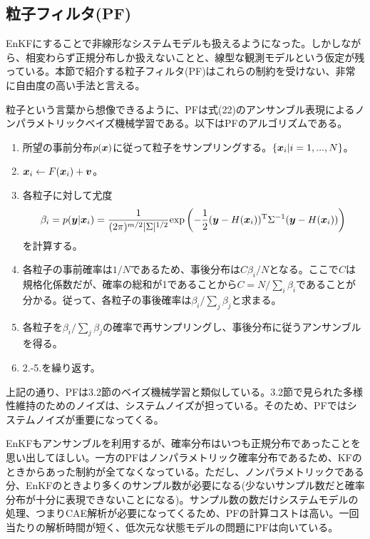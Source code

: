 \documentclass[dvipdfmx, 9pt, a4paper]{jsarticle}
\newcommand{\bm}[1]{{\mbox{\boldmath $#1$}}}
\begin{document}
\subsection{粒子フィルタ(PF)}
EnKFにすることで非線形なシステムモデルも扱えるようになった。しかしながら、相変わらず正規分布しか扱えないことと、線型な観測モデルという仮定が残っている。本節で紹介する粒子フィルタ(PF)はこれらの制約を受けない、非常に自由度の高い手法と言える。\par
粒子という言葉から想像できるように、PFは式(22)のアンサンブル表現によるノンパラメトリックベイズ機械学習である。以下はPFのアルゴリズムである。
\begin{tcolorbox}[title=粒子フィルタ]
\begin{enumerate}
\item 所望の事前分布$p(\bm x)$に従って粒子をサンプリングする。$\{ \bm x_i|i=1,...,N \}$。
\item $\bm x_i \leftarrow F(\bm x_i)+\bm v$。
\item 各粒子に対して尤度
\begin{equation}
\beta_i=p(\bm y|\bm x_i)=\frac{1}{(2\pi)^{m/2}|\Sigma|^{1/2}}{\rm exp}\left(
-\frac{1}{2}(\bm y-H(\bm x_i))^{\rm T}\Sigma^{-1}(\bm y-H(\bm x_i))
\right) \notag
\end{equation}
を計算する。
\item 各粒子の事前確率は$1/N$であるため、事後分布は$C\beta_i/N$となる。ここで$C$は規格化係数だが、確率の総和が1であることから$C=N/\sum_i \beta_i$であることが分かる。従って、各粒子の事後確率は$\beta_i/\sum_j \beta_j$と求まる。
\item 各粒子を$\beta_i/\sum_j \beta_j$の確率で再サンプリングし、事後分布に従うアンサンブルを得る。
\item 2.-5.を繰り返す。
\end{enumerate}
\end{tcolorbox}
上記の通り、PFは3.2節のベイズ機械学習と類似している。3.2節で見られた多様性維持のためのノイズは、システムノイズが担っている。そのため、PFではシステムノイズが重要になってくる。\par
EnKFもアンサンブルを利用するが、確率分布はいつも正規分布であったことを思い出してほしい。一方のPFはノンパラメトリック確率分布であるため、KFのときからあった制約が全てなくなっている。ただし、ノンパラメトリックである分、EnKFのときより多くのサンプル数が必要になる(少ないサンプル数だと確率分布が十分に表現できないことになる)。サンプル数の数だけシステムモデルの処理、つまりCAE解析が必要になってくるため、PFの計算コストは高い。一回当たりの解析時間が短く、低次元な状態モデルの問題にPFは向いている。
\end{document}
